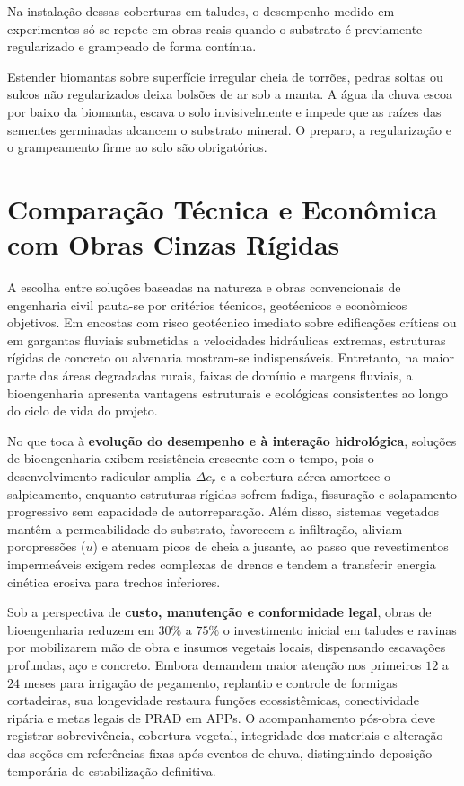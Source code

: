 Na instalação dessas coberturas em taludes, o desempenho medido em experimentos só se repete em obras reais quando o substrato é previamente regularizado e grampeado de forma contínua.

\begin{boxErro}
Estender biomantas sobre superfície irregular cheia de torrões, pedras soltas ou sulcos não regularizados deixa bolsões de ar sob a manta. A água da chuva escoa por baixo da biomanta, escava o solo invisivelmente e impede que as raízes das sementes germinadas alcancem o substrato mineral. O preparo, a regularização e o grampeamento firme ao solo são obrigatórios.
\end{boxErro}

\section{Comparação Técnica e Econômica com Obras Cinzas Rígidas}

A escolha entre soluções baseadas na natureza e obras convencionais de engenharia civil pauta-se por critérios técnicos, geotécnicos e econômicos objetivos. Em encostas com risco geotécnico imediato sobre edificações críticas ou em gargantas fluviais submetidas a velocidades hidráulicas extremas, estruturas rígidas de concreto ou alvenaria mostram-se indispensáveis. Entretanto, na maior parte das áreas degradadas rurais, faixas de domínio e margens fluviais, a bioengenharia apresenta vantagens estruturais e ecológicas consistentes ao longo do ciclo de vida do projeto.

No que toca à \textbf{evolução do desempenho e à interação hidrológica}, soluções de bioengenharia exibem resistência crescente com o tempo, pois o desenvolvimento radicular amplia $\Delta c_r$ e a cobertura aérea amortece o salpicamento, enquanto estruturas rígidas sofrem fadiga, fissuração e solapamento progressivo sem capacidade de autorreparação. Além disso, sistemas vegetados mantêm a permeabilidade do substrato, favorecem a infiltração, aliviam poropressões ($u$) e atenuam picos de cheia a jusante, ao passo que revestimentos impermeáveis exigem redes complexas de drenos e tendem a transferir energia cinética erosiva para trechos inferiores.

Sob a perspectiva de \textbf{custo, manutenção e conformidade legal}, obras de bioengenharia reduzem em $30\%$ a $75\%$ o investimento inicial em taludes e ravinas por mobilizarem mão de obra e insumos vegetais locais, dispensando escavações profundas, aço e concreto. Embora demandem maior atenção nos primeiros $12$ a $24$ meses para irrigação de pegamento, replantio e controle de formigas cortadeiras, sua longevidade restaura funções ecossistêmicas, conectividade ripária e metas legais de PRAD em APPs. O acompanhamento pós-obra deve registrar sobrevivência, cobertura vegetal, integridade dos materiais e alteração das seções em referências fixas após eventos de chuva, distinguindo deposição temporária de estabilização definitiva.

